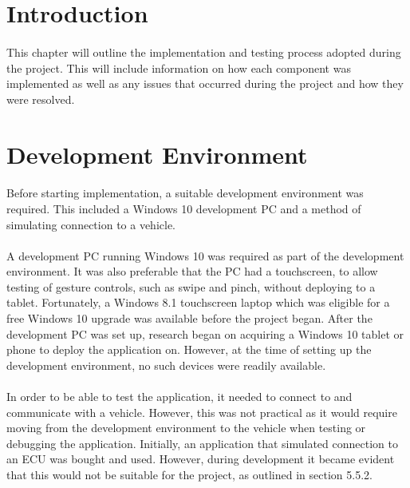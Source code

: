 \section{Introduction}
	\paragraph{}{
	This chapter will outline the implementation and testing process adopted during the project. This will include information on how each component was implemented as well as any issues that occurred during the project and how they were resolved.
	}
\section{Development Environment}
	\paragraph{}{%
	Before starting implementation, a suitable development environment was required. This included a Windows 10 development PC and a method of simulating connection to a vehicle. 
	}
	\paragraph{}{
	A development PC running Windows 10 was required as part of the development environment. It was also preferable that the PC had a touchscreen, to allow testing of gesture controls, such as swipe and pinch, without deploying to a tablet. Fortunately, a Windows 8.1 touchscreen laptop which was eligible for a free Windows 10 upgrade was available before the project began. After the development PC was set up, research began on acquiring a Windows 10 tablet or phone to deploy the application on. However, at the time of setting up the development environment, no such devices were readily available.			
	}
	\paragraph{}{
	In order to be able to test the application, it needed to connect to and communicate with a vehicle. However, this was not practical as it would require moving from the development environment to the vehicle when testing or debugging the application. Initially, an application that simulated connection to an ECU was bought and used. However, during development it became evident that this would not be suitable for the project, as outlined in section 5.5.2.
	}
